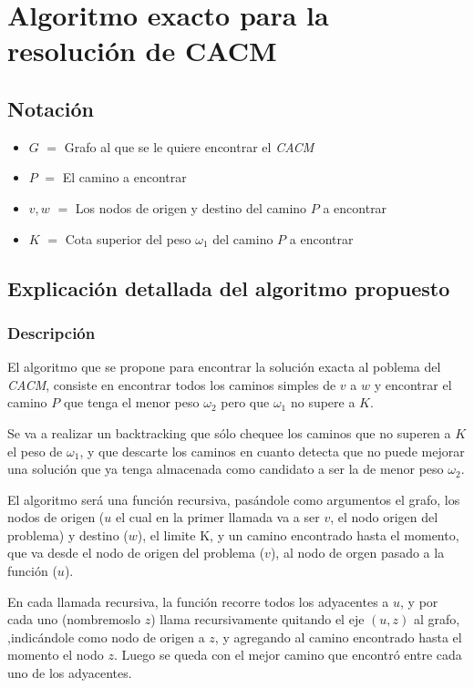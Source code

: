 \section{Algoritmo exacto para la resoluci\'on de CACM}

\subsection{Notaci\'on} \label{exacto:notacion}

\begin{itemize}
	\item $G$ $=$ Grafo al que se le quiere encontrar el \emph{CACM}
	\item $P$ $=$ El camino a encontrar
	\item $v, w$ $=$ Los nodos de origen y destino del camino $P$ a encontrar
	\item $K$ $=$ Cota superior del peso $\omega_1$ del camino $P$ a encontrar
\end{itemize}

\subsection{Explicaci\'on detallada del algoritmo propuesto} \label{exacto:explicacion}

\subsubsection{Descripci\'on}

El algoritmo que se propone para encontrar la soluci\'on exacta al poblema del \emph{CACM}, consiste en encontrar todos los caminos simples de $v$ a $w$
y encontrar el camino $P$ que tenga el menor peso $\omega_2$ pero que $\omega_1$ no supere a $K$.

Se va a realizar un backtracking que s\'olo chequee los caminos que no superen a $K$ el peso de $\omega_1$, y que descarte los caminos en cuanto
detecta que no puede mejorar una soluci\'on que ya tenga almacenada como candidato a ser la de menor peso $\omega_2$.

El algoritmo ser\'a una funci\'on recursiva, pas\'andole como argumentos el grafo, los nodos de origen ($u$ el cual en la primer llamada va a ser $v$,
el nodo origen del problema) y destino ($w$), el limite K, y un camino encontrado hasta el momento, que va desde el nodo de origen del problema ($v$), al nodo de orgen pasado a la funci\'on ($u$).

En cada llamada recursiva, la funci\'on recorre todos los adyacentes a $u$, y por cada uno (nombremoslo $z$) llama recursivamente quitando el eje $(u,z)$ al grafo,
,indic\'andole como nodo de origen a $z$, y agregando al camino encontrado hasta el momento el nodo $z$. Luego se queda con el mejor camino que encontr\'o entre cada uno de los adyacentes.

